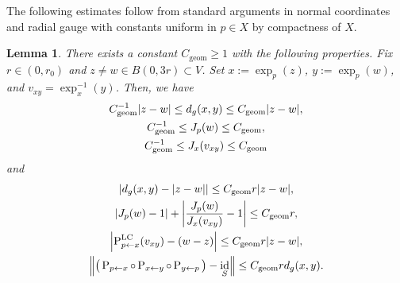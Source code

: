 \documentclass[a4paper,oneside,12pt]{amsart}
\theoremstyle{plain}
\newtheorem{lemma}[theorem]{Lemma}
\theoremstyle{definition}
\theoremstyle{remark}
\DeclarePairedDelimiter{\abs}{\lvert}{\rvert}
\DeclarePairedDelimiter{\norm}{\lVert}{\rVert}
\DeclareMathOperator{\id}{id}
\newcommand{\paralleltransport}[2]{\operatorname{P}_{#2 \gets #1}}
\newcommand{\paralleltransportLC}[2]{\paralleltransport{#1}{#2}^{\mathrm{LC}}}
\newcommand{\constantgeometric}{C_{\mathrm{geom}}}
\begin{document}
The following estimates follow from standard arguments in normal coordinates and radial gauge with constants uniform in $p \in X$ by compactness of $X$.
\begin{lemma}\label{lemma: normal nbd comparison}
  There exists a constant $\constantgeometric \ge 1$ with the following properties.
  Fix $r \in (0,r_0)$ and $z \ne w \in B(0,3r) \subset V$.
  Set $x := \exp_p(z)$, $y := \exp_p(w)$, and $v_{xy} = \exp_x^{-1}(y)$.
  Then, we have
  \begin{gather}
    \constantgeometric^{-1} \abs{z-w} \le d_g(x,y) \le \constantgeometric \abs{z-w}, \label{inequality: uniform distance comparison} \\
    \constantgeometric^{-1}\le J_p(w)\le \constantgeometric, \label{inequality: Jpw bound} \\
    \constantgeometric^{-1}\le J_x(v_{xy})\le \constantgeometric \label{inequality: Jpv bound}
  \end{gather}
  and
  \begin{gather}
    \abs*{d_g(x,y) - \abs{z-w}} \le \constantgeometric r \abs{z-w}, \label{inequality: uniform distance ratio comparison} \\
    \abs{J_p(w)-1} + \abs*{\frac{J_p(w)}{J_x(v_{xy})}-1} \le \constantgeometric r, \label{inequality: jacobian ratio comparison} \\
    \abs*{\paralleltransportLC{x}{p}(v_{xy})-(w-z)} \le \constantgeometric r \abs{z-w},  \label{inequality: parallel transported vector comparison}\\
    \norm*{\big(\paralleltransport{x}{p} \circ \paralleltransport{y}{x} \circ \paralleltransport{p}{y}\big) - \id_{S}} \le \constantgeometric r d_g(x,y). \label{inequality: holonomy bound}
  \end{gather}
\end{lemma}
\end{document}
